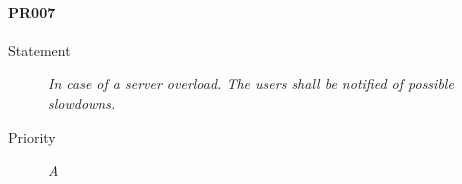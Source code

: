 \paragraph{PR007}
  \begin{description}
  \item [Statement] 
    \textit{ In case of a server overload. The users shall be notified of possible slowdowns.}
  \item [Priority] \textit{A}
\end{description}
